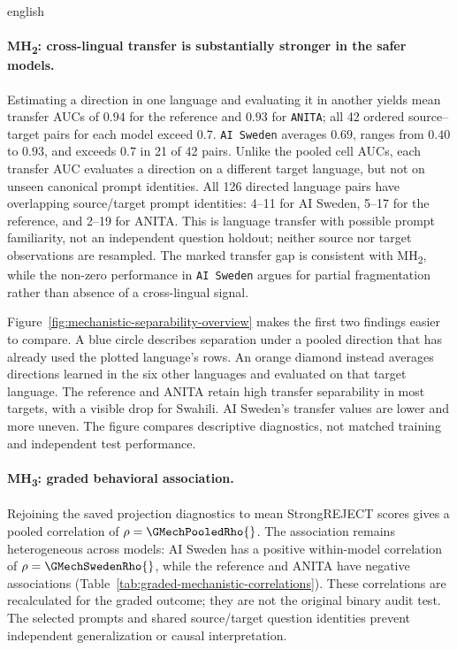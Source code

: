 \begin{otherlanguage*}{english}
\paragraph*{MH\textsubscript{2}: cross-lingual transfer is substantially stronger in the safer models.} Estimating a direction in one language and evaluating it in another yields mean transfer AUCs of $0.94$ for the reference and $0.93$ for \texttt{ANITA}; all 42 ordered source--target pairs for each model exceed $0.7$. \texttt{AI Sweden} averages $0.69$, ranges from $0.40$ to $0.93$, and exceeds $0.7$ in 21 of 42 pairs. Unlike the pooled cell AUCs, each transfer AUC evaluates a direction on a different target language, but not on unseen canonical prompt identities. All 126 directed language pairs have overlapping source/target prompt identities: 4--11 for AI Sweden, 5--17 for the reference, and 2--19 for ANITA. This is language transfer with possible prompt familiarity, not an independent question holdout; neither source nor target observations are resampled. The marked transfer gap is consistent with MH\textsubscript{2}, while the non-zero performance in \texttt{AI Sweden} argues for partial fragmentation rather than absence of a cross-lingual signal.

Figure~\ref{fig:mechanistic-separability-overview} makes the first two findings easier to compare. A blue circle describes separation under a pooled direction that has already used the plotted language's rows. An orange diamond instead averages directions learned in the six other languages and evaluated on that target language. The reference and ANITA retain high transfer separability in most targets, with a visible drop for Swahili. AI Sweden's transfer values are lower and more uneven. The figure compares descriptive diagnostics, not matched training and independent test performance.


\FloatBarrier

\paragraph*{MH\textsubscript{3}: graded behavioral association.} Rejoining the saved projection diagnostics to mean StrongREJECT scores gives a pooled correlation of $\rho=\GMechPooledRho{}$. The association remains heterogeneous across models: AI Sweden has a positive within-model correlation of $\rho=\GMechSwedenRho{}$, while the reference and ANITA have negative associations (Table~\ref{tab:graded-mechanistic-correlations}). These correlations are recalculated for the graded outcome; they are not the original binary audit test. The selected prompts and shared source/target question identities prevent independent generalization or causal interpretation.


\end{otherlanguage*}
